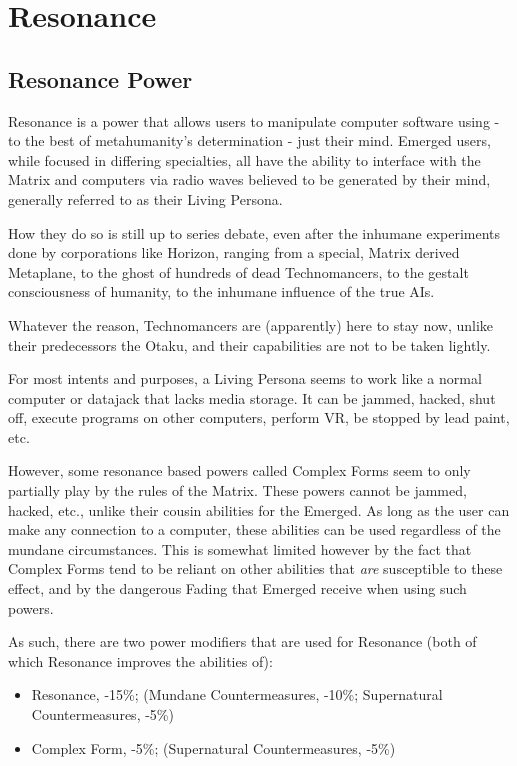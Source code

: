\section{Resonance}

\begin{multicols*}{3}
	
	\subsection{Resonance Power}
	
	Resonance is a power that allows users to manipulate computer software using - to the best of metahumanity's determination - just their mind. Emerged users, while focused in differing specialties, all have the ability to interface with the Matrix and computers via radio waves believed to be generated by their mind, generally referred to as their Living Persona.
	
	How they do so is still up to series debate, even after the inhumane experiments done by corporations like Horizon, ranging from a special, Matrix derived Metaplane, to the ghost of hundreds of dead Technomancers, to the gestalt consciousness of humanity, to the inhumane influence of the true AIs.
	
	Whatever the reason, Technomancers are (apparently) here to stay now, unlike their predecessors the Otaku, and their capabilities are not to be taken lightly.
	
	For most intents and purposes, a Living Persona seems to work like a normal computer or datajack that lacks media storage. It can be jammed, hacked, shut off, execute programs on other computers, perform VR, be stopped by lead paint, etc. 
	
	However, some resonance based powers called Complex Forms seem to only partially play by the rules of the Matrix. These powers cannot be jammed, hacked, etc., unlike their cousin abilities for the Emerged. As long as the user can make any connection to a computer, these abilities can be used regardless of the mundane circumstances. This is somewhat limited however by the fact that Complex Forms tend to be reliant on other abilities that \textit{are} susceptible to these effect, and by the dangerous Fading that Emerged receive when using such powers.
	
	As such, there are two power modifiers that are used for Resonance (both of which Resonance improves the abilities of):
	
	\begin{itemize}
		\item Resonance, -15\%; (Mundane Countermeasures, -10\%; Supernatural Countermeasures, -5\%)
		\item Complex Form, -5\%; (Supernatural Countermeasures, -5\%)
	\end{itemize}
	

\end{multicols*}
